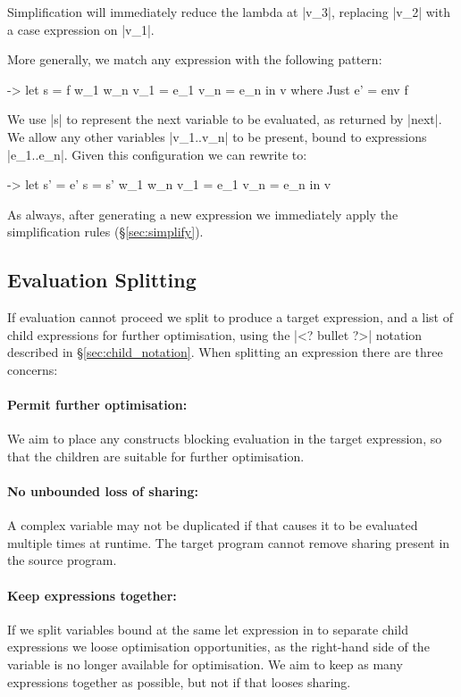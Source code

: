 \documentclass[draft]{sigplanconf}
\begin{document}
Simplification will immediately reduce the lambda at |v_3|, replacing |v_2| with a case expression on |v_1|.

More generally, we match any expression with the following pattern:

\begin{code}
\free ->  let  s    = f w_1 w_n
               v_1  = e_1
               v_n  = e_n
          in   v
where Just e' = env f
\end{code}

We use |s| to represent the next variable to be evaluated, as returned by |next|. We allow any other variables |v_1..v_n| to be present, bound to expressions |e_1..e_n|. Given this configuration we can rewrite to:

\begin{code}
\free ->  let  s'   = e'
               s    = s' w_1 w_n
               v_1  = e_1
               v_n  = e_n
          in   v
\end{code}

As always, after generating a new expression we immediately apply the simplification rules (\S\ref{sec:simplify}).

\subsection{Evaluation Splitting}
\label{sec:eval_split}

If evaluation cannot proceed we split to produce a target expression, and a list of child expressions for further optimisation, using the |<? bullet ?>| notation described in \S\ref{sec:child_notation}. When splitting an expression there are three concerns:

\paragraph{Permit further optimisation:} We aim to place any constructs blocking evaluation in the target expression, so that the children are suitable for further optimisation.

\paragraph{No unbounded loss of sharing:} A complex variable may not be duplicated if that causes it to be evaluated multiple times at runtime. The target program cannot remove sharing present in the source program.

\paragraph{Keep expressions together:} If we split variables bound at the same let expression in to separate child expressions we loose optimisation opportunities, as the right-hand side of the variable is no longer available for optimisation. We aim to keep as many expressions together as possible, but not if that looses sharing.
\end{document}
